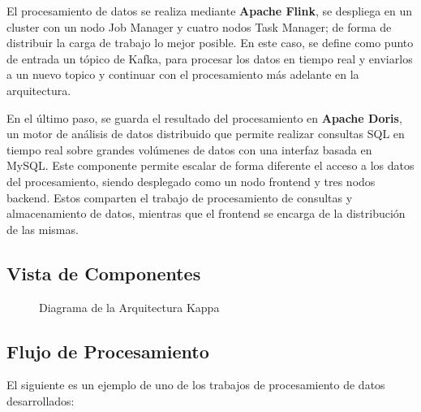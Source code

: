 El procesamiento de datos se realiza mediante \textbf{Apache Flink},
se despliega en un cluster con un nodo Job Manager y cuatro nodos Task Manager; de forma de distribuir la carga de trabajo lo mejor posible.
En este caso, se define como punto de entrada un tópico de Kafka, para procesar los datos en tiempo real y
enviarlos a un nuevo topico y continuar con el procesamiento más adelante en la arquitectura.\newline

En el último paso, se guarda el resultado del procesamiento en \textbf{Apache Doris}, un motor de análisis de datos
distribuido que permite realizar consultas SQL en tiempo real sobre grandes volúmenes de datos con una interfaz basada en MySQL.
Este componente permite escalar de forma diferente el acceso a los datos del procesamiento, 
siendo desplegado como un nodo frontend y tres nodos backend. 
Estos comparten el trabajo de procesamiento de consultas y almacenamiento de datos, 
mientras que el frontend se encarga de la distribución de las mismas. 

\newpage
\subsection{Vista de Componentes}

\begin{figure}[h]
    \caption{Diagrama de la Arquitectura Kappa}
    \label{fig:des_arquitectura_kappa}
\end{figure}

\newpage

\subsection{Flujo de Procesamiento}

El siguiente es un ejemplo de uno de los trabajos de procesamiento de datos desarrollados:

